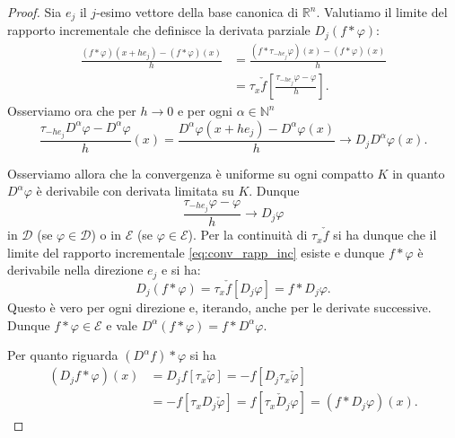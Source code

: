 \documentclass[italian,a4paper,oneside,headinclude]{scrbook}
\renewcommand{\phi}{\varphi}
\newcommand{\D}{\mathcal D}
\newcommand{\E}{\mathcal E}
\newcommand{\NN}{\mathbb N}
\newcommand{\RR}{\mathbb R}
\begin{document}
\begin{proof}
      Sia $e_j$ il $j$-esimo vettore della base canonica di
      $\RR^n$. Valutiamo il limite del rapporto incrementale che
      definisce la derivata parziale
      $D_j(f*\phi)$:
      \begin{equation}\label{eq:conv_rapp_inc}
      \begin{aligned}
        \frac{(f*\phi)(x+he_j) - (f*\phi)(x)}{h}
        &= \frac{(f*\tau_{-he_j}\phi)(x) - (f*\phi)(x)}{h} \\
        &= \tau_x\check f\left[\frac{\tau_{-he_j} \phi - \phi}{h}\right].
      \end{aligned}
      \end{equation}
      Osserviamo ora che per $h\to 0$ e per ogni $\alpha\in \NN^n$
      \[
      \frac{\tau_{-he_j}D^\alpha\phi-D^\alpha\phi}{h}(x) =
      \frac{D^\alpha\phi(x+he_j)-D^\alpha\phi(x)}{h}
      \to D_j D^\alpha\phi(x).
      \]


      Osserviamo allora che la convergenza è uniforme su ogni compatto $K$
      in quanto $D^\alpha\phi$ è derivabile con derivata limitata su
      $K$.
      Dunque
      \[
      \frac{\tau_{-he_j}\phi -\phi}{h}\to
      D_j \phi
      \]
      in $\D$ (se $\phi \in \D$) o in $\E$ (se $\phi \in \E$).
      Per la continuità di $\tau_x\check f$ si ha dunque che
      il limite del rapporto incrementale \eqref{eq:conv_rapp_inc}
      esiste e dunque $f*\phi$ è derivabile nella direzione
      $e_j$ e si ha:
      \[
      D_j(f*\phi) = \tau_x \check
      f[D_j\phi] =
      f * D_j\phi.
      \]
      Questo è vero per ogni direzione e, iterando, anche per le derivate
      successive. Dunque $f*\phi\in \E$ e vale $D^\alpha(f*\phi)
      = f * D^\alpha \phi$.

      Per quanto riguarda $(D^\alpha f)*\phi$ si ha
      \begin{align*}
        (D_j f*\phi)(x)
        &= D_j f [\tau_x\check \phi]
        = - f [D_j \tau_x\check \phi]\\
        &= - f[\tau_x D_j \check\phi]
        = f[\tau_x \check D_j \phi]
        = (f * D_j \phi)(x).
      \end{align*}
\end{proof}
\end{document}
